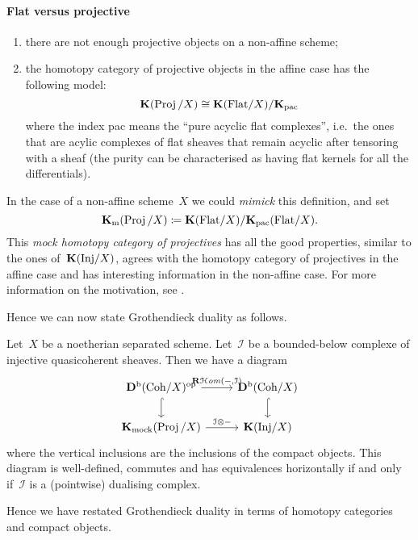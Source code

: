 \documentclass[10pt,a4paper]{article}
\begin{document}
\paragraph{Flat versus projective}
\begin{enumerate}
  \item there are not enough projective objects on a non-affine scheme;
  \item the homotopy category of projective objects in the affine case has the following model:
    \begin{equation}
      \mathbf{K}(\operatorname{Proj}/X)\cong\mathbf{K}(\mathrm{Flat}/X)/\mathbf{K}_{\mathrm{pac}}
    \end{equation}
    where the index pac means the ``pure acyclic flat complexes'', i.e.\ the ones that are acylic complexes of flat sheaves that remain acyclic after tensoring with a sheaf (the purity can be characterised as having flat kernels for all the differentials).
\end{enumerate}
In the case of a non-affine scheme~$X$ we could \emph{mimick} this definition, and set
\begin{equation}
  \mathbf{K}_{\mathrm{m}}(\operatorname{Proj}/X)\coloneqq\mathbf{K}(\mathrm{Flat}/X)/\mathbf{K}_{\mathrm{pac}}(\mathrm{Flat}/X).
\end{equation}
This \emph{mock homotopy category of projectives} has all the good properties, similar to the ones of~$\mathbf{K}(\mathrm{Inj}/X)$, agrees with the homotopy category of projectives in the affine case and has interesting information in the non-affine case. For more information on the motivation, see \cite[chapter 1]{murfet-phd}.

Hence we can now state Grothendieck duality as follows.
\begin{theorem}
  Let~$X$ be a noetherian separated scheme. Let~$\mathcal{I}$ be a bounded-below complexe of injective quasicoherent sheaves. Then we have a diagram
  \begin{equation}
    \begin{tikzcd}
      \derived^\bounded(\Coh/X)^{\mathrm{op}} \arrow{r}{\RRRHHom(-,\mathcal{I})} \arrow[hook]{d} & \derived^\bounded(\Coh/X) \arrow[hook]{d} \\
      \KKK_{\mathrm{mock}}(\Proj/X) \arrow{r}{\mathcal{I}\otimes-} & \KKK(\Inj/X)
    \end{tikzcd}
  \end{equation}
  where the vertical inclusions are the inclusions of the compact objects. This diagram is well-defined, commutes and has equivalences horizontally if and only if~$\mathcal{I}$ is a (pointwise) dualising complex.
\end{theorem}
Hence we have restated Grothendieck duality in terms of homotopy categories and compact objects.
\end{document}
